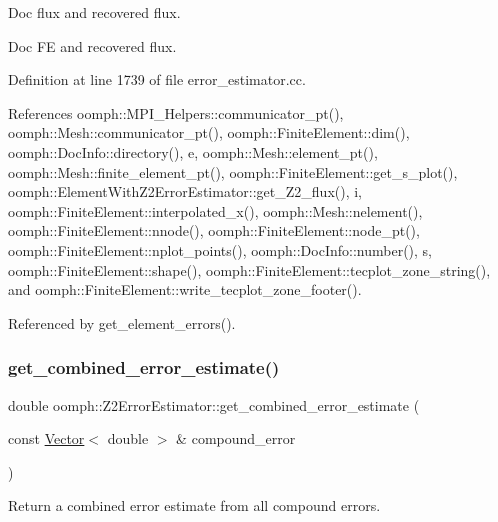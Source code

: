 Doc flux and recovered flux. 

Doc FE and recovered flux. 

Definition at line 1739 of file error\+\_\+estimator.\+cc.



References oomph\+::\+M\+P\+I\+\_\+\+Helpers\+::communicator\+\_\+pt(), oomph\+::\+Mesh\+::communicator\+\_\+pt(), oomph\+::\+Finite\+Element\+::dim(), oomph\+::\+Doc\+Info\+::directory(), e, oomph\+::\+Mesh\+::element\+\_\+pt(), oomph\+::\+Mesh\+::finite\+\_\+element\+\_\+pt(), oomph\+::\+Finite\+Element\+::get\+\_\+s\+\_\+plot(), oomph\+::\+Element\+With\+Z2\+Error\+Estimator\+::get\+\_\+\+Z2\+\_\+flux(), i, oomph\+::\+Finite\+Element\+::interpolated\+\_\+x(), oomph\+::\+Mesh\+::nelement(), oomph\+::\+Finite\+Element\+::nnode(), oomph\+::\+Finite\+Element\+::node\+\_\+pt(), oomph\+::\+Finite\+Element\+::nplot\+\_\+points(), oomph\+::\+Doc\+Info\+::number(), s, oomph\+::\+Finite\+Element\+::shape(), oomph\+::\+Finite\+Element\+::tecplot\+\_\+zone\+\_\+string(), and oomph\+::\+Finite\+Element\+::write\+\_\+tecplot\+\_\+zone\+\_\+footer().



Referenced by get\+\_\+element\+\_\+errors().

\mbox{\label{classoomph_1_1Z2ErrorEstimator_a53d7a1ac66dd41b39d6794e1d00080fc}} 
\subsubsection{\texorpdfstring{get\+\_\+combined\+\_\+error\+\_\+estimate()}{get\_combined\_error\_estimate()}}
{\footnotesize\ttfamily double oomph\+::\+Z2\+Error\+Estimator\+::get\+\_\+combined\+\_\+error\+\_\+estimate (\begin{DoxyParamCaption}\item[{const \hyperlink{classoomph_1_1Vector}{Vector}$<$ double $>$ \&}]{compound\+\_\+error }\end{DoxyParamCaption})}



Return a combined error estimate from all compound errors. 

